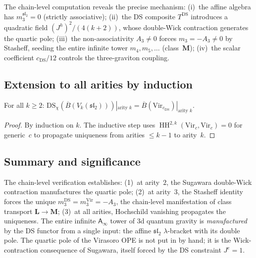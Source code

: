 \documentclass[11pt]{article}
\newcommand{\fsl}{\mathfrak{sl}}
\newcommand{\barB}{\overline{B}}
\newcommand{\Ainf}{\mathsf{A}_{\infty}}
\newcommand{\HH}{\operatorname{HH}}
\begin{document}
\begin{observation}%
\label{obs:wn-sugawara-manufactures-m3}
The chain-level computation reveals the precise mechanism:
(i)~the affine algebra has $m_3^{\fsl_2} = 0$ (strictly associative);
(ii)~the DS composite $T^{\mathrm{DS}}$ introduces a quadratic field
$(J^h)^2/(4(k+2))$, whose double-Wick contraction generates the
quartic pole;
(iii)~the non-associativity $A_3 \ne 0$ forces $m_3 = -A_3 \ne 0$
by Stasheff, seeding the entire infinite tower
$m_4, m_5, \ldots$ (class~$\mathbf{M}$);
(iv)~the scalar coefficient $c_{\mathrm{DS}}/12$ controls the
three-graviton coupling.
\end{observation}

\subsection{Extension to all arities by induction}

\begin{proposition}%
\label{prop:wn-ds-bar-all-arities}
For all $k \ge 2$:
$\mathrm{DS}_\chi(\barB(V_k(\fsl_2)))|_{\text{arity }k}
= \barB(\mathrm{Vir}_{c_{\mathrm{DS}}})|_{\text{arity }k}$.
\end{proposition}

\begin{proof}
By induction on $k$.  The inductive step uses
$\HH^{2,k}(\mathrm{Vir}_c, \mathrm{Vir}_c) = 0$ for
generic~$c$ to propagate uniqueness from arities $\le k-1$
to arity~$k$.
\end{proof}

\subsection{Summary and significance}

The chain-level verification establishes: (1)~at arity~$2$,
the Sugawara double-Wick contraction manufactures the quartic pole;
(2)~at arity~$3$, the Stasheff identity forces the unique
$m_3^{\mathrm{DS}} = m_3^{\mathrm{Vir}} = -A_3$, the chain-level
manifestation of class transport $\mathbf{L} \to \mathbf{M}$;
(3)~at all arities, Hochschild vanishing propagates the uniqueness.
The entire infinite $\Ainf$ tower of 3d quantum gravity is
\emph{manufactured} by the DS functor from a single input: the
affine $\fsl_2$ $\lambda$-bracket with its double pole.
The quartic pole of the Virasoro OPE is not put in by hand;
it is the Wick-contraction consequence of Sugawara, itself
forced by the DS constraint $J^e = 1$.
\end{document}
